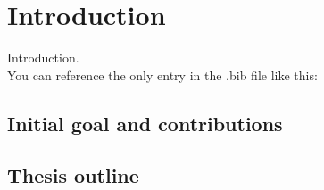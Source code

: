 \chapter{Introduction}
Introduction.\\
You can reference the only entry in the .bib file like this: \cite{Arenas2009}

\section{Initial goal and contributions}

\section{Thesis outline}

